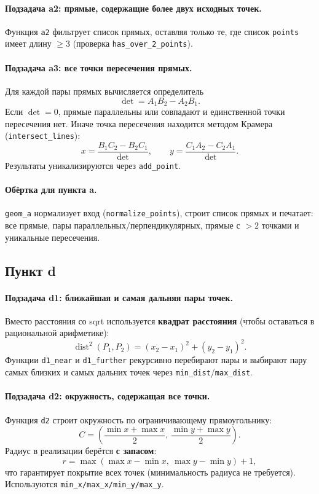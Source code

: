 \documentclass[a4paper, 11pt]{article}
\begin{document}
\paragraph{Подзадача a2: прямые, содержащие более двух исходных точек.}
Функция \texttt{a2} фильтрует список прямых, оставляя только те, где список \texttt{points} имеет длину $\ge 3$
(проверка \texttt{has\_over\_2\_points}).

\paragraph{Подзадача a3: все точки пересечения прямых.}
Для каждой пары прямых вычисляется определитель
\[
\det = A_1B_2 - A_2B_1.
\]
Если $\det=0$, прямые параллельны или совпадают и единственной точки пересечения нет.
Иначе точка пересечения находится методом Крамера (\texttt{intersect\_lines}):
\[
x = \frac{B_1C_2 - B_2C_1}{\det},\qquad
y = \frac{C_1A_2 - C_2A_1}{\det}.
\]
Результаты уникализируются через \texttt{add\_point}.

\paragraph{Обёртка для пункта a.}
\texttt{geom\_a} нормализует вход (\texttt{normalize\_points}), строит список прямых и печатает:
все прямые, пары параллельных/перпендикулярных, прямые с $>2$ точками и уникальные пересечения.

\subsection*{Пункт d}

\paragraph{Подзадача d1: ближайшая и самая дальняя пары точек.}
Вместо расстояния со sqrt используется \textbf{квадрат расстояния} (чтобы оставаться в рациональной арифметике):
\[
\operatorname{dist}^2(P_1,P_2)=(x_2-x_1)^2+(y_2-y_1)^2.
\]
Функции \texttt{d1\_near} и \texttt{d1\_further} рекурсивно перебирают пары и выбирают пару самых близких и самых дальних точек через
\texttt{min\_dist}/\texttt{max\_dist}.

\paragraph{Подзадача d2: окружность, содержащая все точки.}
Функция \texttt{d2} строит окружность по ограничивающему прямоугольнику:
\[
C=\left(\frac{\min x+\max x}{2},\,\frac{\min y+\max y}{2}\right).
\]
Радиус в реализации берётся \textbf{с запасом}:
\[
r=\max(\max x-\min x,\ \max y-\min y)+1,
\]
что гарантирует покрытие всех точек (минимальность радиуса не требуется).
Используются \texttt{min\_x/max\_x/min\_y/max\_y}.
\end{document}
